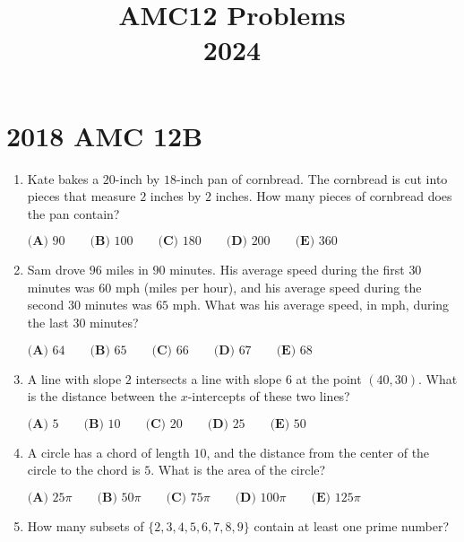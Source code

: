 \documentclass{article}
\title{AMC12 Problems \\ 2024}
\date{}
\begin{document}
\maketitle\thispagestyle{fancy}\newpage\section*{2018 AMC 12B}\begin{enumerate}[label=\arabic*., itemsep=0.5em]\item Kate bakes a \(20\)-inch by \(18\)-inch pan of cornbread. The cornbread is cut into pieces that measure \(2\) inches by \(2\) inches. How many pieces of cornbread does the pan contain?

\(\textbf{(A) } 90 \qquad \textbf{(B) } 100 \qquad \textbf{(C) } 180 \qquad \textbf{(D) } 200 \qquad \textbf{(E) } 360\)\par \vspace{0.5em}\item Sam drove \(96\) miles in \(90\) minutes. His average speed during the first \(30\) minutes was \(60\) mph (miles per hour), and his average speed during the second \(30\) minutes was \(65\) mph. What was his average speed, in mph, during the last \(30\) minutes?

\(
\textbf{(A) } 64 \qquad
\textbf{(B) } 65 \qquad
\textbf{(C) } 66 \qquad
\textbf{(D) } 67 \qquad
\textbf{(E) } 68
\)\par \vspace{0.5em}\item A line with slope \(2\) intersects a line with slope \(6\) at the point \((40,30)\). What is the distance between the \(x\)-intercepts of these two lines? 

\(\textbf{(A) } 5 \qquad \textbf{(B) } 10 \qquad \textbf{(C) } 20 \qquad \textbf{(D) } 25 \qquad \textbf{(E) } 50\)\par \vspace{0.5em}\item A circle has a chord of length \(10\), and the distance from the center of the circle to the chord is \(5\). What is the area of the circle?

\(
\textbf{(A) }25\pi \qquad
\textbf{(B) }50\pi \qquad
\textbf{(C) }75\pi \qquad
\textbf{(D) }100\pi \qquad
\textbf{(E) }125\pi \qquad
\)\par \vspace{0.5em}\item How many subsets of \(\{2,3,4,5,6,7,8,9\}\) contain at least one prime number?


\end{enumerate}
\end{document}

